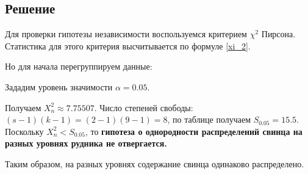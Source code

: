 \documentclass[12pt]{article}
\begin{document}
\vspace{1mm}


\subsection{Решение}

Для проверки гипотезы независимости воспользуемся критерием $\chi^2$ Пирсона. Статистика для этого критерия высчитывается по формуле \eqref{xi_2}.

Но для начала перегруппируем данные:

\vspace{1mm}


\vspace{1mm}

Зададим уровень значимости $\alpha = 0.05$.

Получаем $X_n^2 \approx 7.75507$. Число степеней свободы: $(s-1)(k-1)=(2-1)(9-1)=8$, по таблице получаем $S_{0.05} = 15.5$. Поскольку $X_n^2<S_{0.05}$, то \textbf{гипотеза о однородности распределений свинца на разных уровнях рудника не отвергается.}

Таким образом, на разных уровнях содержание свинца одинаково распределено.
\end{document}
